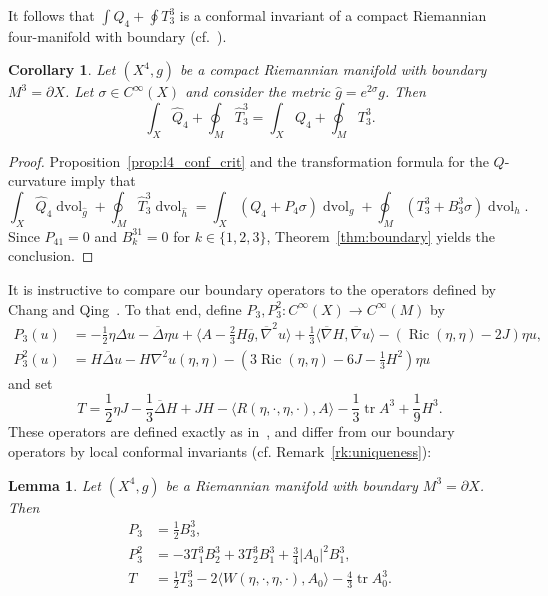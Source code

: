 \documentclass{amsart}
\newtheorem{lem}[thm]{Lemma}
\newtheorem{cor}[thm]{Corollary}
\theoremstyle{definition}
\theoremstyle{remark}
\numberwithin{equation}{section}
\begin{document}
It follows that $\int Q_4+\oint T_3^3$ is a conformal invariant of a compact Riemannian four-manifold with boundary (cf.\ \cite{ChangQing1997a}).

\begin{cor}
 \label{cor:boundary_q4_invariant}
 Let $(X^4,g)$ be a compact Riemannian manifold with boundary $M^3=\partial X$.  Let $\sigma\in C^\infty(X)$ and consider the metric ${\widehat{g}}=e^{2\sigma}g$.  Then
 \[ \int_X {\widehat{Q}}_4 + \oint_M {\widehat{T}}_3^3 = \int_X Q_4 + \oint_M T_3^3 . \]
\end{cor}

\begin{proof}
 Proposition~\ref{prop:l4_conf_crit} and the transformation formula for the $Q$-curvature imply that
 \[ \int_X{\widehat{Q}}_4\operatorname{dvol}_{\widehat{g}} + \oint_M {\widehat{T}}_3^3\operatorname{dvol}_{\widehat{h}} = \int_X \left(Q_4 + P_4\sigma\right)\operatorname{dvol}_g + \oint_M \left(T_3^3 + B_3^3\sigma\right)\operatorname{dvol}_h . \]
 Since $P_41=0$ and $B_k^31=0$ for $k\in\{1,2,3\}$, Theorem~\ref{thm:boundary} yields the conclusion.
\end{proof}

It is instructive to compare our boundary operators to the operators defined by Chang and Qing~\cite{ChangQing1997a}.  To that end, define $P_3,P_3^2\colon C^\infty(X)\to C^\infty(M)$ by
\begin{align*}
 P_3(u) & = -\frac{1}{2}\eta\Delta u - {\overline{\Delta}}\eta u + {\langle} A-\frac{2}{3}H{\overline{g}},{\overline{\nabla}}^2u{\rangle} + \frac{1}{3}{\langle}{\overline{\nabla}} H,{\overline{\nabla}} u{\rangle} - \left(\operatorname{Ric}(\eta,\eta)-2J\right)\eta u, \\
 P_3^2(u) & = H{\overline{\Delta}} u - H\nabla^2u(\eta,\eta) - \left(3\operatorname{Ric}(\eta,\eta) - 6J - \frac{1}{3}H^2\right)\eta u
\end{align*}
and set
\[ T = \frac{1}{2}\eta J - \frac{1}{3}{\overline{\Delta}} H + JH - {\langle} R(\eta,\cdot,\eta,\cdot), A{\rangle} - \frac{1}{3}\operatorname{tr} A^3 + \frac{1}{9}H^3 . \]
These operators are defined exactly as in~\cite{ChangQing1997a}, and differ from our boundary operators by local conformal invariants (cf. Remark~\ref{rk:uniqueness}):

\begin{lem}
 \label{lem:cf_changqing_local}
 Let $(X^4,g)$ be a Riemannian manifold with boundary $M^3=\partial X$.  Then
 \begin{align*}
  P_3 & = \frac{1}{2}B_3^3, \\
  P_3^2 & = -3T_1^3B_2^3 + 3T_2^3B_1^3 + \frac{3}{4}{\lvert} A_0{\rvert}^2B_1^3, \\
  T & = \frac{1}{2}T_3^3 - 2{\langle} W(\eta,\cdot,\eta,\cdot), A_0{\rangle} - \frac{4}{3}\operatorname{tr} A_0^3 .
 \end{align*}
\end{lem}
\end{document}
